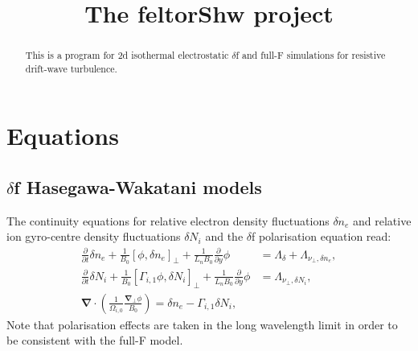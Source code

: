 \documentclass{hitec} %
\renewcommand{\vec}[1]{\boldsymbol{#1}}
\begin{document}
\title{The feltorShw project}
\maketitle

\begin{abstract}
This is a program for 2d isothermal electrostatic \(\delta\)f and full-F simulations for resistive drift-wave turbulence.
\end{abstract}
\section{Equations}
\subsection{\(\delta\)f Hasegawa-Wakatani models}
The continuity equations for relative electron density fluctuations \(\delta n_e\) and relative ion gyro-centre density fluctuations  \(\delta N_i\) and the \(\delta\)f polarisation equation read:
\begin{align}
 \frac{\partial}{\partial t }\delta n_e + \frac{1}{B_0} \left[\phi,\delta n_e\right]_{\perp}  +\frac{1}{L_n B_0}  \frac{\partial }{\partial y} \phi  &= \Lambda_\delta + \Lambda_{\nu_\perp,\delta n_e}
,\\
 \frac{\partial}{\partial t }\delta N_i +\frac{1}{B_0} \left[\Gamma_{i,1}\phi,\delta N_i \right]_{\perp}   +\frac{1}{L_n B_0}  \frac{\partial }{\partial y}\phi  &= \Lambda_{\nu_\perp,\delta N_i},\\
 \vec{\nabla} \cdot \left(\frac{1}{\Omega_{i,0}} \frac{\vec{\nabla}_\perp \phi}{B_0}\right)= \delta n_e - \Gamma_{i,1}\delta N_i,
\end{align}
Note that polarisation effects are taken in the long wavelength limit in order to be consistent with the full-F model.
\end{document}
